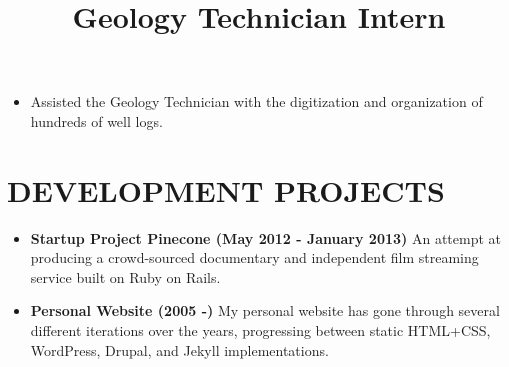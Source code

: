 \documentclass[line, overlapped]{res}
\begin{document}
\begin{resume}
    \title{Geology Technician Intern}
    \begin{position}
        \begin{itemize}
            \item Assisted the Geology Technician with the digitization and organization of hundreds of well logs.
        \end{itemize}
    \end{position}


    \section{DEVELOPMENT PROJECTS}

        \begin{itemize}[leftmargin=10pt]
        \item \textbf{Startup Project Pinecone (May 2012 - January 2013)} An attempt at producing a crowd-sourced documentary and independent film streaming service built on Ruby on Rails.
        \item \textbf{Personal Website (2005 -)} My personal website has gone through several different iterations over the years, progressing between static HTML+CSS, WordPress, Drupal, and Jekyll implementations.
        \end{itemize}

\end{resume}
\end{document}
